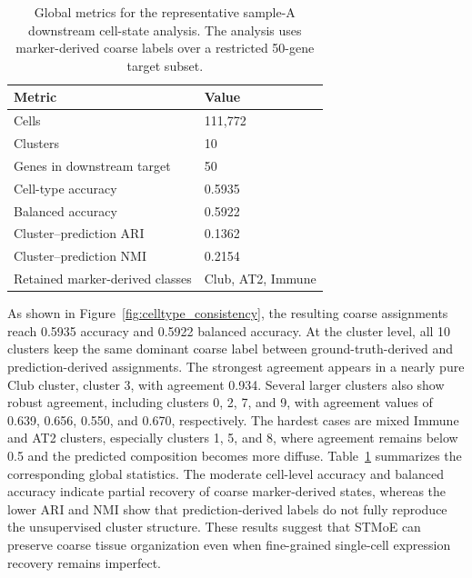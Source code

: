 \documentclass[sigconf]{acmart}
\newcommand{\method}{STMoE\xspace}
\begin{document}





\begin{table}[t]
\centering
\small
\setlength{\tabcolsep}{5pt}
\renewcommand{\arraystretch}{1.12}
\caption{Global metrics for the representative sample-A downstream cell-state analysis. The analysis uses marker-derived coarse labels over a restricted 50-gene target subset.}
\label{tab:celltype_global}
\begin{tabularx}{\columnwidth}{@{}lX@{}}
\toprule
Metric & Value \\
\midrule
Cells & 111{,}772 \\
Clusters & 10 \\
Genes in downstream target & 50 \\
Cell-type accuracy & 0.5935 \\
Balanced accuracy & 0.5922 \\
Cluster--prediction ARI & 0.1362 \\
Cluster--prediction NMI & 0.2154 \\
Retained marker-derived classes & Club, AT2, Immune \\
\bottomrule
\end{tabularx}
\end{table}



As shown in Figure~\ref{fig:celltype_consistency}, the resulting coarse assignments reach 0.5935 accuracy and 0.5922 balanced accuracy. At the cluster level, all 10 clusters keep the same dominant coarse label between ground-truth-derived and prediction-derived assignments. The strongest agreement appears in a nearly pure Club cluster, cluster 3, with agreement 0.934. Several larger clusters also show robust agreement, including clusters 0, 2, 7, and 9, with agreement values of 0.639, 0.656, 0.550, and 0.670, respectively. The hardest cases are mixed Immune and AT2 clusters, especially clusters 1, 5, and 8, where agreement remains below 0.5 and the predicted composition becomes more diffuse. Table~\ref{tab:celltype_global} summarizes the corresponding global statistics. The moderate cell-level accuracy and balanced accuracy indicate partial recovery of coarse marker-derived states, whereas the lower ARI and NMI show that prediction-derived labels do not fully reproduce the unsupervised cluster structure. These results suggest that \method{} can preserve coarse tissue organization even when fine-grained single-cell expression recovery remains imperfect.
\end{document}
